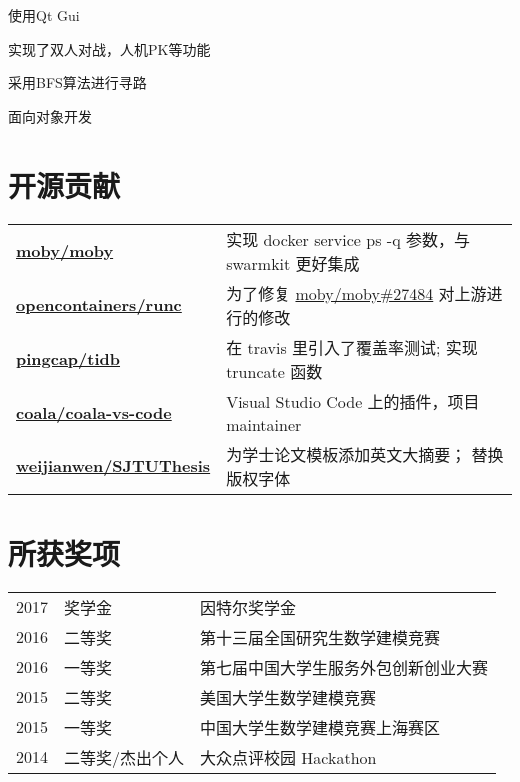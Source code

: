 \documentclass[]{deedy-resume-openfont}
\begin{document}
\begin{minipage}[t]{0.73\textwidth}
\begin{tightemize}
\item 使用Qt Gui
\item 实现了双人对战，人机PK等功能
\item 采用BFS算法进行寻路
\item 面向对象开发
\end{tightemize}
\sectionsep




\section{开源贡献}
\begin{tabular}{ll}
\href{https://github.com/moby/moby/commits?author=gaocegege}{\bf moby/moby} & 实现 docker service ps -q 参数，与 swarmkit 更好集成 \\
\href{https://github.com/opencontainers/runc/commits?author=gaocegege}{\bf opencontainers/runc} & 为了修复 \href{https://github.com/moby/moby/issues/27484}{moby/moby\#27484} 对上游进行的修改 \\
\href{https://github.com/pingcap/tidb/commits?author=gaocegege}{\bf pingcap/tidb} & 在 travis 里引入了覆盖率测试; 实现 truncate 函数 \\
\href{https://github.com/coala/coala-vs-code/commits/master?author=gaocegege}{\bf coala/coala-vs-code} & Visual Studio Code 上的插件，项目 maintainer \\
\href{https://github.com/weijianwen/SJTUThesis/commits?author=gaocegege}{\bf weijianwen/SJTUThesis} & 为学士论文模板添加英文大摘要； 替换版权字体 \\
\end{tabular}
\sectionsep


\section{所获奖项} 
\begin{tabular}{rll}
2017         & 奖学金  & 因特尔奖学金 \\
2016	     & 二等奖  & 第十三届全国研究生数学建模竞赛 \\
2016	     & 一等奖  & 第七届中国大学生服务外包创新创业大赛 \\
2015	     & 二等奖  & 美国大学生数学建模竞赛 \\
2015         & 一等奖 & 中国大学生数学建模竞赛上海赛区 \\
2014	     & 二等奖/杰出个人  & 大众点评校园 Hackathon \\
\end{tabular}
\sectionsep


\end{minipage}
\end{document}
